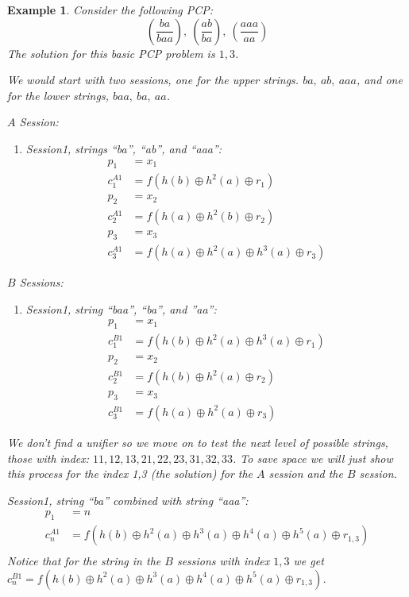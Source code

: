 \documentclass[11pt,twoside,a4paper]{article}
\newtheorem{example}{Example}
\begin{document}
{\begin{example}
		Consider the following PCP:
		\[
		(\frac{ba}{baa}),~(\frac{ab}{ba}),~(\frac{aaa}{aa})
		\]
		The solution for this basic PCP problem is $1,3$.
		
		We would start with two sessions, one for the 
		upper strings. $ba, ~ab, ~aaa$, and one for the lower
		strings, $baa, ~ba, ~aa$. 
		
		\noindent
		$A$ Session:
		\begin{enumerate}
			\item Session1, strings ``ba'', ``ab'', and ``aaa'':
			\begin{align*}
			p_1 &= x_1\\
			c^{A1}_1 &= f(h(b) \oplus h^2(a) \oplus r_1)\\
			p_2 &= x_2\\
			c^{A1}_2 &= f(h(a) \oplus h^2(b) \oplus r_2)\\
			p_3 &= x_3\\
			c^{A1}_3 &= f(h(a) \oplus h^2(a) \oplus h^3(a) \oplus r_3)
			\end{align*}
		\end{enumerate}
		
		\noindent
		$B$ Sessions:
		\begin{enumerate}
			\item Session1, string ``baa'', ``ba'', and ''aa'':
			\begin{align*}
			p_1 &= x_1\\
			c^{B1}_1 &= f(h(b) \oplus h^2(a) \oplus h^3(a) \oplus r_1)\\
			p_2 &= x_2\\
			c^{B1}_2 &= f(h(b) \oplus h^2(a) \oplus r_2)\\
			p_3 &= x_3\\
			c^{B1}_3 &= f(h(a) \oplus h^2(a) \oplus r_3)
			\end{align*}
		\end{enumerate}
		
		We don't find a unifier so we move on to test the next level of
		possible strings, those with index: $11, 12, 13, 21, 22, 23, 31, 32, 33$. To save space we will just show this process for 
		the index 1,3 (the solution) for the $A$ session and the 
		$B$ session.
		
		Session1, string ``ba'' combined with string ``aaa'':
		\begin{align*}
		p_1 &= n\\
		c^{A1}_n &= f(h(b) \oplus h^2(a) 
		\oplus h^3(a) \oplus h^4(a) \oplus h^5(a)
		 \oplus r_{1,3})\\
		\end{align*}
		Notice that for the string in the $B$ sessions with index $1,3$ we get
		$c^{B1}_n= f(h(b) \oplus h^2(a) 
		\oplus h^3(a) \oplus h^4(a) \oplus h^5(a)
		\oplus r_{1,3})$.
		

\end{example}}
\end{document}
